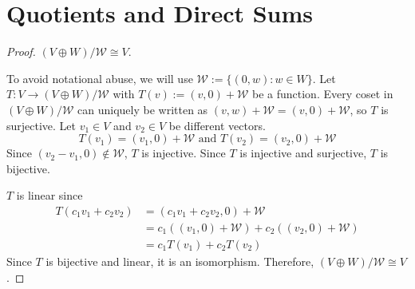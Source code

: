 \section{Quotients and Direct Sums}
\begin{proof}$(V \oplus W)/\mathcal{W} \cong V$.\gap
    
    To avoid notational abuse, we will use $\mathcal{W} :=\{(0,w):w \in W\}$.
    Let $T: V \rightarrow (V \oplus W)/\mathcal{W}$ 
    with $T(v) := (v,0) + \mathcal{W}$ be a function.
    Every coset in $(V \oplus W)/\mathcal{W}$ can uniquely
    be written as $(v,w) + \mathcal{W} = (v,0) + \mathcal{W}$,
    so $T$ is surjective.
    Let $v_1 \in V$ and $v_2 \in V$ be different vectors.
    \[
        T(v_1) = (v_1,0) + \mathcal{W}
        \text{ and }
        T(v_2) = (v_2,0) + \mathcal{W}
    \]
    Since $(v_2-v_1,0) \notin \mathcal{W}$, $T$ is injective.
    Since $T$ is injective and surjective, $T$ is bijective.\gap

    $T$ is linear since
    \begin{align*}
        T(c_1v_1 + c_2v_2) 
        &=(c_1v_1 + c_2v_2,0) + \mathcal{W}\\
        &= c_1((v_1,0) + \mathcal{W}) + c_2((v_2,0) + \mathcal{W})\\
        &= c_1T(v_1) + c_2T(v_2)
    \end{align*}
    Since $T$ is bijective and linear, it is an isomorphism.
    Therefore, $(V \oplus W)/\mathcal{W} \cong V$.
\end{proof}